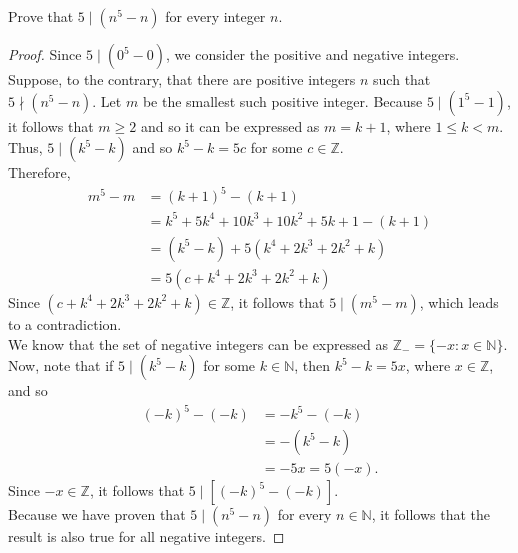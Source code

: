 \documentclass[12pt]{article}
\newcommand{\N}{\mathbb{N}}
\newcommand{\Z}{\mathbb{Z}}
\newenvironment{problem}[2][Problem]{\begin{trivlist}
		\item[\hskip \labelsep {\bfseries #1}\hskip \labelsep {\bfseries #2.}]}{\end{trivlist}}
\begin{document}
\begin{problem}{36}
	Prove that $5\mid (n^{5}-n)$ for every integer $n$. 
	\begin{proof}
		 Since $5\mid (0^{5}-0)$, we consider the positive and negative integers. Suppose, to the contrary, that there are positive integers $n$ such that $5\nmid (n^{5}-n)$. Let $m$ be the smallest such positive integer. Because $5\mid (1^{5}-1)$, it follows that $m\geq 2$ and so it can be expressed as $m=k+1$, where $1\leq k<m$. Thus, $5\mid (k^{5}-k)$ and so $k^{5}-k = 5c$ for some $c\in \Z$. \\
		 Therefore,
		 \begin{align*}
		 	m^{5}-m &= (k+1)^{5}-(k+1)\\
		 	&= k^{5} + 5k^{4} +10k^{3} + 10k^{2}+5k+1-(k+1)\\
		 	&= (k^{5}-k) + 5\left(k^{4}+2k^{3}+2k^{2}+k\right)\\
		 	&= 5\left(c + k^{4}+2k^{3}+2k^{2}+k\right)
		 \end{align*}
	 Since $\left(c + k^{4}+2k^{3}+2k^{2}+k\right) \in \Z$, it follows that $5\mid (m^{5}-m)$, which leads to a contradiction.\\
	 
	  We know that the set of negative integers can be expressed as $\Z_{-} = \{-x:x\in \N\}$. Now, note that if  $5\mid \left(k^{5}-k\right)$ for some $k\in \N$, then $k^{5} - k = 5x$, where $x\in \Z$, and so
	 \begin{align*}
	 	(-k)^{5} - (-k) &= -k^{5} - (-k)\\
	 	&= - \left(k^{5}-k\right)\\
	 	&= -5x = 5(-x).
	 \end{align*}
 Since $-x\in \Z$, it follows that $5\mid \left[(-k)^{5}-(-k)\right]$. \\
 
 Because we have proven that $5\mid \left(n^{5} - n\right)$ for every $n\in \N$, it follows that the result is also true for all negative integers.
	\end{proof}
\end{problem}
\end{document}
